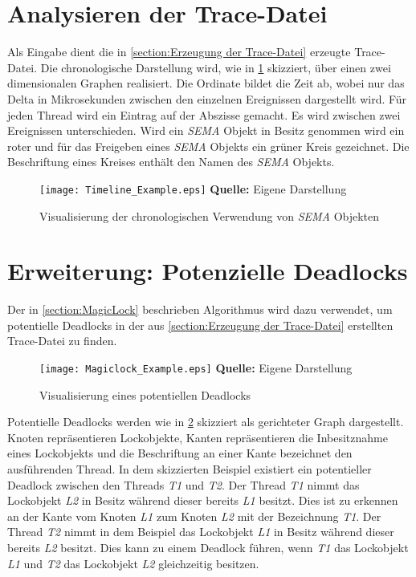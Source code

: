 \section{Analysieren der Trace-Datei}
\label{section:Analysieren der Trace-Datei}
Als Eingabe dient die in \cref{section:Erzeugung der Trace-Datei} erzeugte
Trace-Datei. Die chronologische Darstellung wird, wie in
\cref{fig:Timeline_Example} skizziert, über einen zwei dimensionalen Graphen
realisiert. Die Ordinate bildet die Zeit ab, wobei nur das Delta in
Mikrosekunden zwischen den einzelnen Ereignissen dargestellt wird. Für jeden
Thread wird ein Eintrag auf der Abszisse gemacht. Es wird zwischen zwei
Ereignissen unterschieden. Wird ein \emph{SEMA} Objekt in Besitz genommen wird
ein roter und für das Freigeben eines \emph{SEMA} Objekts ein grüner Kreis
gezeichnet. Die Beschriftung eines Kreises enthält den Namen des \emph{SEMA}
Objekts.
\begin{figure}[ht]
  \texttt{[image: Timeline\_Example.eps]}
  \footnotesize\sffamily\textbf{Quelle:} Eigene Darstellung
  \caption{Visualisierung der chronologischen Verwendung von \emph{SEMA} Objekten}
  \label{fig:Timeline_Example}
\end{figure}

\section{Erweiterung: Potenzielle Deadlocks}
\label{section:Erweiterung: Potenzielle Deadlocks}
Der in \cref{section:MagicLock} beschrieben Algorithmus wird dazu verwendet, um
potentielle Deadlocks in der aus \cref{section:Erzeugung der Trace-Datei}
erstellten Trace-Datei zu finden. 
\begin{figure}[ht]
  \texttt{[image: Magiclock\_Example.eps]}
  \footnotesize\sffamily\textbf{Quelle:} Eigene Darstellung
  \caption{Visualisierung eines potentiellen Deadlocks}
  \label{fig:Magiclock_Example}
\end{figure}

Potentielle Deadlocks werden wie in \cref{fig:Magiclock_Example} skizziert als
gerichteter Graph dargestellt. Knoten repräsentieren Lockobjekte, Kanten
repräsentieren die Inbesitznahme eines Lockobjekts und die Beschriftung an einer
Kante bezeichnet den ausführenden Thread. In dem skizzierten Beispiel existiert
ein potentieller Deadlock zwischen den Threads \emph{T1} und \emph{T2}. Der
Thread \emph{T1} nimmt das Lockobjekt \emph{L2} in Besitz während dieser bereits
\emph{L1} besitzt. Dies ist zu erkennen an der Kante vom Knoten \emph{L1} zum
Knoten \emph{L2} mit der Bezeichnung \emph{T1}. Der Thread \emph{T2} nimmt in
dem Beispiel das Lockobjekt \emph{L1} in Besitz während dieser bereits \emph{L2}
besitzt. Dies kann zu einem Deadlock führen, wenn \emph{T1} das Lockobjekt
\emph{L1} und \emph{T2} das Lockobjekt \emph{L2} gleichzeitig besitzen.